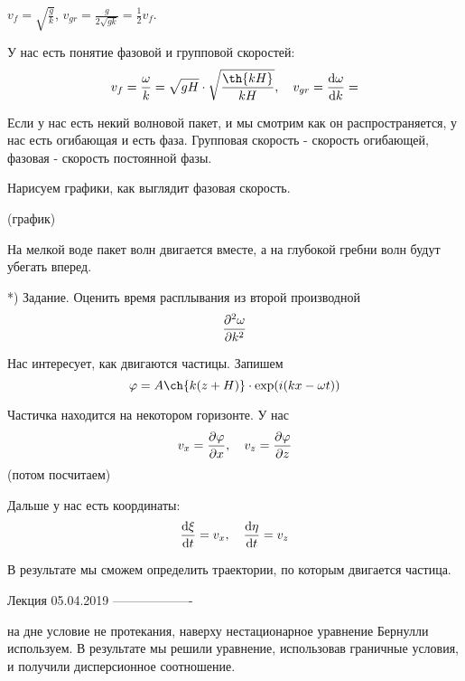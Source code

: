 $v_f=\sqrt{\frac{g}{k}}$, $v_{gr}=\frac{g}{2\sqrt{gk}}=\frac12 v_f$.

У нас есть понятие фазовой и групповой скоростей:
\begin{equation}
	v_f=\frac{\omega}{k}=\sqrt{gH}\cdot\sqrt{\frac{\th{kH}}{kH}}, \quad
	v_{gr}=\dv{\omega}{k}=
\end{equation}

Если у нас есть некий волновой пакет, и мы смотрим как он распространяется, у нас есть огибающая и есть фаза. Групповая скорость - скорость огибающей, фазовая - скорость постоянной фазы.

Нарисуем графики, как выглядит фазовая скорость.

(график) 

\begin{comment}
v_f
^              _
| \           / 
|  \       /
|   \    /
|    \_/
|
|________________________________>l
\end{comment}

На мелкой воде пакет волн двигается вместе, а на глубокой гребни волн будут убегать вперед. 

*) Задание.
Оценить время расплывания из второй производной
\begin{equation}
	\pdv[2]{\omega}{k} 	
\end{equation} 


Нас интересует, как двигаются частицы. Запишем 
\begin{equation}
	\phi=A\ch{k(z+H)}\cdot\exp(i(kx-\omega t))
\end{equation}

Частичка находится на некотором горизонте. У нас 
\begin{equation}
	v_x=\pdv{\varphi}{x}, \quad v_z=\pdv{\varphi}{z}
\end{equation}
(потом посчитаем)

Дальше у нас есть координаты: 
\begin{equation}
	\dv{\xi}{t}=v_x, \quad \dv{\eta}{t}=v_z
\end{equation}

В результате мы сможем определить траектории, по которым двигается частица.

Лекция 05.04.2019
-------------------

на дне условие не протекания, наверху нестационарное уравнение Бернулли используем. В результате мы решили уравнение, использовав граничные условия, и получили дисперсионное соотношение.

